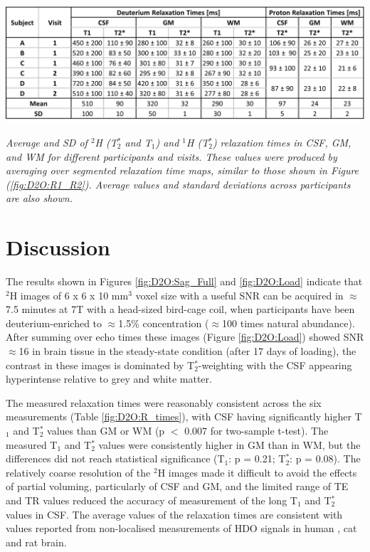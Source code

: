 \documentclass[class=article, crop=false]{standalone}
\begin{document}
\begin{table}[H]
    \centering
    \includegraphics[width=1\textwidth]{Figures/D2O/R_Times.png}
    \caption{\textit{Average and SD of $^2$H (T$_2^*$ and T$_1$) and $^1$H (T$_2^*$) relaxation times in CSF, GM, and WM for different participants and visits. These values were produced by averaging over segmented relaxation time maps, similar to those shown in Figure (\ref{fig:D2O:R1_R2}). Average values and standard deviations across participants are also shown.}}
    \label{fig:D2O:R_times}
\end{table}
 
\section{Discussion}

The results shown in Figures \ref{fig:D2O:Sag_Full} and \ref{fig:D2O:Load} indicate that $^2$H images of 6 x 6 x 10 mm$^3$ voxel size with a useful SNR can be acquired in $\approx$7.5 minutes at 7T with a head-sized bird-cage coil, when participants have been deuterium-enriched to $\approx$1.5\% concentration ($\approx$100 times natural abundance). After summing over echo times these images (Figure \ref{fig:D2O:Load}) showed SNR $\approx$16 in brain tissue in the steady-state condition (after 17 days of loading), the contrast in these images is dominated by T$_2^*$-weighting with the CSF appearing hyperintense relative to grey and white matter.

The measured relaxation times were reasonably consistent across the six measurements (Table \ref{fig:D2O:R_times}), with CSF having significantly higher T$_1$ and T$_2^*$ values than GM or WM (p $<$ 0.007 for two-sample t-test). The measured T$_1$ and T$_2^*$ values were consistently higher in GM than in WM, but the differences did not reach statistical significance (T$_1$: p = 0.21; T$_2^*$: p = 0.08). The relatively coarse resolution of the $^2$H images made it difficult to avoid the effects of partial voluming, particularly of CSF and GM, and the limited range of TE and TR values reduced the accuracy of measurement of the long T$_1$ and T$_2^*$ values in CSF. The average values of the relaxation times are consistent with values reported from non-localised measurements of HDO signals in human \cite{DeFeyter2018DeuteriumVivo,DeFeyter2021DeuteriumFuture,Ruhm2021DeuteriumResolution}, cat \cite{Ewy1988DeuteriumSitu} and rat  \cite{DeFeyter2018DeuteriumVivo,Lu2017QuantitativeSpectroscopy} brain.
\end{document}

